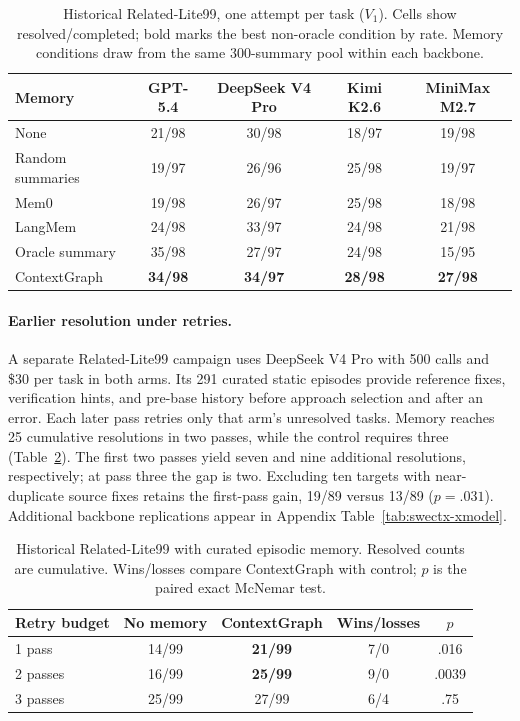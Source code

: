 \begin{table}[!htbp]
\centering
\caption{Historical Related-Lite99, one attempt per task ($V_1$).
Cells show resolved/completed; bold marks the best non-oracle condition by rate.
Memory conditions draw from the same 300-summary pool within each backbone.}
\label{tab:swectx-crossmodel}
\begin{tabular}{lcccc}
\toprule
Memory & GPT-5.4 & DeepSeek V4 Pro & Kimi K2.6 & MiniMax M2.7 \\
\midrule
None & 21/98 & 30/98 & 18/97 & 19/98 \\
Random summaries & 19/97 & 26/96 & 25/98 & 19/97 \\
Mem0 & 19/98 & 26/97 & 25/98 & 18/98 \\
LangMem & 24/98 & 33/97 & 24/98 & 21/98 \\
Oracle summary & 35/98 & 27/97 & 24/98 & 15/95 \\
ContextGraph & \textbf{34/98} & \textbf{34/97} & \textbf{28/98} & \textbf{27/98} \\
\bottomrule
\end{tabular}
\end{table}

\paragraph{Earlier resolution under retries.}
A separate Related-Lite99 campaign uses DeepSeek V4 Pro with 500 calls and
\$30 per task in both arms. Its 291 curated static episodes provide reference
fixes, verification hints, and pre-base history before approach selection and
after an error. Each later pass retries only that arm's unresolved tasks.
Memory reaches 25 cumulative resolutions in two passes, while the control
requires three (Table~\ref{tab:swectx-stream}). The first two passes yield seven
and nine additional resolutions, respectively; at pass three the gap is two.
Excluding ten targets with near-duplicate source fixes retains the first-pass
gain, 19/89 versus 13/89 ($p=.031$). Additional backbone replications appear
in Appendix Table~\ref{tab:swectx-xmodel}.

\begin{table}[!htbp]
\centering
\caption{Historical Related-Lite99 with curated episodic memory.
Resolved counts are cumulative. Wins/losses compare ContextGraph with control;
$p$ is the paired exact McNemar test.}
\label{tab:swectx-stream}
\begin{tabular}{lcccc}
\toprule
Retry budget & No memory & ContextGraph & Wins/losses & $p$ \\
\midrule
1 pass & 14/99 & \textbf{21/99} & 7/0 & .016 \\
2 passes & 16/99 & \textbf{25/99} & 9/0 & .0039 \\
3 passes & 25/99 & 27/99 & 6/4 & .75 \\
\bottomrule
\end{tabular}
\end{table}

